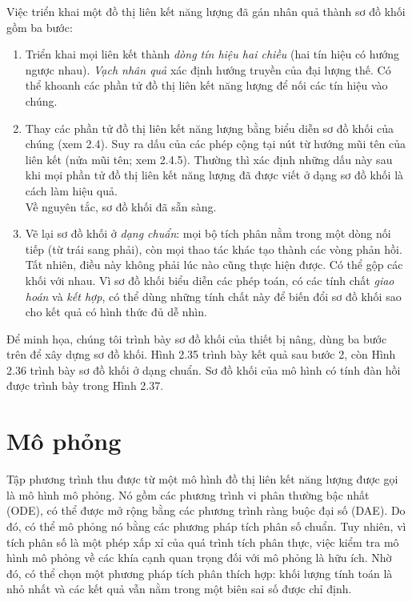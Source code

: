 Việc triển khai một đồ thị liên kết năng lượng đã gán nhân quả thành sơ đồ khối gồm ba bước:
\begin{enumerate}
\item Triển khai mọi liên kết thành \emph{dòng tín hiệu hai chiều} (hai tín hiệu có hướng ngược nhau). \emph{Vạch nhân quả} xác định hướng truyền của đại lượng thế. Có thể khoanh các phần tử đồ thị liên kết năng lượng để nối các tín hiệu vào chúng.
\item Thay các phần tử đồ thị liên kết năng lượng bằng biểu diễn sơ đồ khối của chúng (xem 2.4). Suy ra dấu của các phép cộng tại nút từ hướng mũi tên của liên kết (nửa mũi tên; xem 2.4.5). Thường thì xác định những dấu này sau khi mọi phần tử đồ thị liên kết năng lượng đã được viết ở dạng sơ đồ khối là cách làm hiệu quả.\\
Về nguyên tắc, sơ đồ khối đã sẵn sàng.
\item Vẽ lại sơ đồ khối ở \emph{dạng chuẩn}: mọi bộ tích phân nằm trong một dòng nối tiếp (từ trái sang phải), còn mọi thao tác khác tạo thành các vòng phản hồi. Tất nhiên, điều này không phải lúc nào cũng thực hiện được. Có thể gộp các khối với nhau.
Vì sơ đồ khối biểu diễn các phép toán, có các tính chất \emph{giao hoán} và \emph{kết hợp}, có thể dùng những tính chất này để biến đổi sơ đồ khối sao cho kết quả có hình thức đủ dễ nhìn.
\end{enumerate}

Để minh họa, chúng tôi trình bày sơ đồ khối của thiết bị nâng, dùng ba bước trên để xây dựng sơ đồ khối. Hình 2.35 trình bày kết quả sau bước 2, còn Hình 2.36 trình bày sơ đồ khối ở dạng chuẩn. Sơ đồ khối của mô hình có tính đàn hồi được trình bày trong Hình 2.37.

\section{Mô phỏng}
Tập phương trình thu được từ một mô hình đồ thị liên kết năng lượng được gọi là mô hình mô phỏng. Nó gồm các phương trình vi phân thường bậc nhất (ODE), có thể được mở rộng bằng các phương trình ràng buộc đại số (DAE). Do đó, có thể mô phỏng nó bằng các phương pháp tích phân số chuẩn. Tuy nhiên, vì tích phân số là một phép xấp xỉ của quá trình tích phân thực, việc kiểm tra mô hình mô phỏng về
các khía cạnh quan trọng đối với mô phỏng là hữu ích. Nhờ đó, có thể chọn một phương pháp tích phân thích hợp: khối lượng tính toán là nhỏ nhất và các kết quả vẫn nằm trong một biên sai số được chỉ định.

